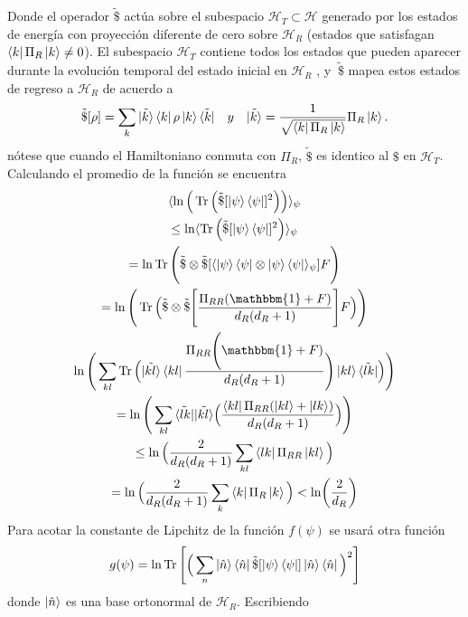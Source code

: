 Donde el operador  $ \tilde{\$} $ actúa sobre el subespacio $\mathcal{H}_{T} \subset \mathcal{H}$ generado por los estados de energía con proyección diferente de cero sobre $\mathcal{H}_{R}$ (estados que satisfagan $\bra{k} \Pi_{R} \ket{k} \neq 0$). El subespacio $\mathcal{H}_{T}$ contiene todos los estados que pueden aparecer durante la evolución temporal del estado inicial en $\mathcal{H}_{R}$ , y $\ \widetilde{\$} $ mapea estos estados de regreso a $\mathcal{H}_{R}$ de acuerdo a 
\begin{equation}
 \tilde{\$}[\rho]= \sum_{k}  \tilde{\ket{k}} \bra{k} \rho \ket{k} \tilde{\bra{k}} \quad y \quad  \tilde{\ket{k}}= \frac{1}{\sqrt{\bra{k}\Pi_{R}\ket{k}}} \Pi_{R} \ket{k}.
\end{equation}
nótese que cuando el Hamiltoniano conmuta con $\Pi_{R}$, $ \tilde{\$}$ es identico al $ \$ $ en $\mathcal{H}_{T}$. Calculando el promedio de la función se encuentra
\begin{multline}
\langle \ln \Big( \Tr \Big( \tilde{\$}[ \ket{\psi}\bra{\psi}]^{2} \Big) \Big) \rangle_{\psi}\\
\leq \ln \langle \Tr \Big( \tilde{\$}[\ket{\psi}\bra{\psi}]^{2} \Big) \rangle_{\psi}\\
= \ln \Tr\Bigg( \tilde{\$}\otimes \tilde{\$} [\langle \ket{\psi}\bra{\psi} \otimes \ket{\psi}\bra{\psi} \rangle_{\psi}] F \Bigg)\\
= \ln \Bigg( \Tr \Big( \tilde{\$}\otimes \tilde{\$} \Bigg[ \frac{\Pi_{RR}(\mathbbm{1}+F)}{d_{R}(d_{R}+1)} \Bigg] F   \Big) \Bigg)\\
\ln \Bigg( \sum_{kl} \Tr \Big( \tilde{\ket{kl}} \bra{kl} \frac{\Pi_{RR} \Bigg ( \mathbbm{1}+F)}{d_{R}(d_{R}+1)} \Bigg) \ket{kl}  \tilde{\bra{lk}}  \Big) \Bigg)\\
= \ln \Bigg( \sum_{kl} \tilde{\bra{lk}}\tilde{\ket{kl}} \Big( \frac{\bra{kl}\Pi_{RR}(\ket{kl}+\ket{lk})}{d_{R}(d_{R}+1)} \Big) \Bigg)\\
\leq \ln \Big( \frac{2}{d_{R}(d_{R}+1)} \sum_{kl} \bra{lk}\Pi_{RR}\ket{kl}  \Big)\\
= \ln \Big(  \frac{2}{d_{R}(d_{R}+1)} \sum_{k} \bra{k}\Pi_{R} \ket{k}  \Big) < \ln (\frac{2}{d_{R}})
\end{multline}
Para acotar la constante de Lipchitz  de la función $f(\psi)$ se usará otra función
\begin{equation}
g(\psi)= \ln \Tr \Bigg[  \Big( \sum_{n} \ket{\hat{n}}\bra{\hat{n}} \tilde{\$} [\ket{\psi}\bra{\psi}] \ket{\hat{n}}\bra{\hat{n}} \Big)^{2}  \Bigg]
\end{equation}
donde $\ket{\hat{n}}$ es una base ortonormal de $\mathcal{H}_{R}$. Escribiendo


